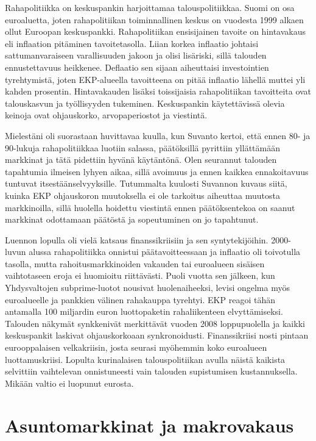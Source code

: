\documentclass[12pt]{article}
\begin{document}
Rahapolitiikka on keskuspankin harjoittamaa talouspolitiikkaa. Suomi on osa euroaluetta, joten rahapolitiikan toiminnallinen keskus on vuodesta 1999 alkaen ollut Euroopan keskuspankki. Rahapolitiikan ensisijainen tavoite on hintavakaus eli inflaation pitäminen tavoitetasolla. Liian korkea inflaatio johtaisi sattumanvaraiseen varallisuuden jakoon ja olisi lisäriski, sillä talouden ennustettavuus heikkenee. Deflaatio sen sijaan aiheuttaisi investointien tyrehtymistä, joten EKP-alueella tavoitteena on pitää inflaatio lähellä muttei yli kahden prosentin. Hintavakauden lisäksi toissijaisia rahapolitiikan tavoitteita ovat talouskasvun ja työllisyyden tukeminen. Keskuspankin käytettävissä olevia keinoja ovat ohjauskorko, arvopaperiostot ja viestintä.

Mielestäni oli suorastaan huvittavaa kuulla, kun Suvanto kertoi, että ennen 80- ja 90-lukuja rahapolitiikkaa luotiin salassa, päätöksillä pyrittiin yllättämään markkinat ja tätä pidettiin hyvänä käytäntönä. Olen seurannut talouden tapahtumia ilmeisen lyhyen aikaa, sillä avoimuus ja ennen kaikkea ennakoitavuus tuntuvat itsestäänselvyyksille. Tutummalta kuulosti Suvannon kuvaus siitä, kuinka EKP ohjauskoron muutoksella ei ole tarkoitus aiheuttaa muutosta markkinoilla, sillä huolella hoidettu viestintä ennen päätöksentekoa on saanut markkinat odottamaan päätöstä ja sopeutuminen on jo tapahtunut.

Luennon lopulla oli vielä katsaus finanssikriisiin ja sen syntytekijöihin. 2000-luvun alussa rahapolitiikka onnistui päätavoitteessaan ja inflaatio oli toivotulla tasolla, mutta rahoitusmarkkinoiden vakauden tai euroalueen sisäisen vaihtotaseen eroja ei huomioitu riittävästi. Puoli vuotta sen jälkeen, kun Yhdysvaltojen subprime-luotot nousivat huolenaiheeksi, levisi ongelma myös euroalueelle ja pankkien välinen rahakauppa tyrehtyi. EKP reagoi tähän antamalla 100 miljardin euron luottopaketin rahaliikenteen elvyttämiseksi. Talouden näkymät synkkenivät merkittävät vuoden 2008 loppupuolella ja kaikki keskuspankit laskivat ohjauskorkoaan synkronoidusti. Finanssikriisi nosti pintaan eurooppalaisen velkakriisin, josta seurasi myöhemmin koko euroalueen luottamuskriisi. Lopulta kurinalaisen talouspolitiikan avulla näistä kaikista selvittiin vaihtelevan onnistuneesti vain talouden supistumisen kustannuksella. Mikään valtio ei luopunut eurosta.


\newpage
\section{Asuntomarkkinat ja makrovakaus}
\end{document}
